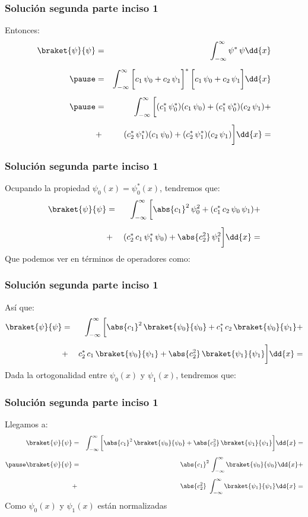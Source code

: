 \begin{frame}
\frametitle{Solución segunda parte inciso 1}
Entonces:
\begin{eqnarray*}
\braket{\psi}{\psi} &=& \int_{-\infty}^{\infty} \psi^{*} \, \psi \dd{x} \\[0.5em] \pause
&=& \int_{-\infty}^{\infty} \bigg[ c_{1} \, \psi_{0} + c_{2} \, \psi_{1} \bigg]^{*} \, \bigg[ c_{1} \, \psi_{0} + c_{2} \, \psi_{1} \bigg] \dd{x} \\[0.5em] \pause 
&=& \int_{-\infty}^{\infty} \bigg[ (c_{1}^{*} \, \psi_{0}^{*})(c_{1} \, \psi_{0}) + (c_{1}^{*} \, \psi_{0}^{*})(c_{2} \, \psi_{1}) + \\[0.5em] 
&+& (c_{2}^{*} \, \psi_{1}^{*})(c_{1} \, \psi_{0}) + (c_{2}^{*} \, \psi_{1}^{*})(c_{2} \, \psi_{1}) \bigg] \dd{x} =
\end{eqnarray*}
\end{frame}
\begin{frame}
\frametitle{Solución segunda parte inciso 1}
Ocupando la propiedad $\psi_{0}(x) = \psi_{0}^{*} (x)$, tendremos que:
\begin{eqnarray*}
\braket{\psi}{\psi} &=& \int_{-\infty}^{\infty} \bigg[ \abs{c_{1}}^{2} \, \psi_{0}^{2} + (c_{1}^{*} \, c_{2} \, \psi_{0} \, \psi_{1}) + \\[0.5em] 
&+& (c_{2}^{*} \, c_{1} \, \psi_{1}^{*} \, \psi_{0}) + \abs{c_{2}^{2}} \, \psi_{1}^{2} \bigg] \dd{x} =
\end{eqnarray*}
\pause
Que podemos ver en términos de operadores como:
\end{frame}
\begin{frame}
\frametitle{Solución segunda parte inciso 1}
Así que:
\begin{eqnarray*}
\braket{\psi}{\psi} &=& \int_{-\infty}^{\infty} \bigg[ \abs{c_{1}}^{2} \, \braket{\psi_{0}}{\psi_{0}} + c_{1}^{*} \, c_{2} \, \braket{\psi_{0}}{\psi_{1}} + \\[0.5em] 
&+& c_{2}^{*} \, c_{1} \, \braket{\psi_{0}}{\psi_{1}} + \abs{c_{2}^{2}} \, \braket{\psi_{1}}{\psi_{1}} \bigg] \dd{x}=
\end{eqnarray*}
\pause
Dada la ortogonalidad entre $\psi_{0}(x)$ y $\psi_{1}(x)$, tendremos que:
\end{frame}
\begin{frame}
\frametitle{Solución segunda parte inciso 1}
Llegamos a:
\begin{eqnarray*}
\braket{\psi}{\psi} &=& \int_{-\infty}^{\infty} \bigg[ \abs{c_{1}}^{2} \, \braket{\psi_{0}}{\psi_{0}} + \abs{c_{2}^{2}} \, \braket{\psi_{1}}{\psi_{1}} \bigg] \dd{x} = \\[0.5em] \pause
\braket{\psi}{\psi} &=&  \abs{c_{1}}^{2} \, \int_{-\infty}^{\infty} \braket{\psi_{0}}{\psi_{0}} \dd{x} + \\[0.5em]
&+& \abs{c_{2}^{2}} \, \, \int_{-\infty}^{\infty} \braket{\psi_{1}}{\psi_{1}} \dd{x} =
\end{eqnarray*}
\pause
Como $\psi_{0}(x)$ y $\psi_{1}(x)$ están normalizadas 
\end{frame}
